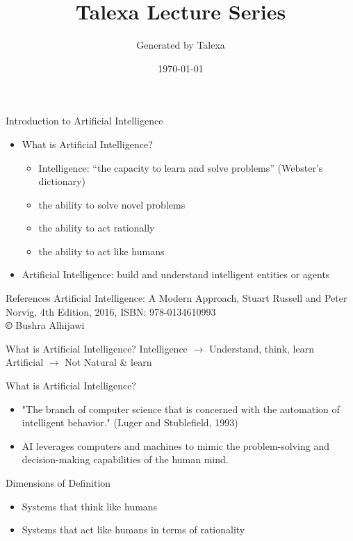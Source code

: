 \documentclass{beamer}
\title{Talexa Lecture Series}
\author{Generated by Talexa}
\date{\today}
\begin{document}
\begin{frame}
    \titlepage
\end{frame}

\begin{frame}{Introduction to Artificial Intelligence}
\begin{itemize}
\item What is Artificial Intelligence?
  \begin{itemize}
  \item Intelligence: “the capacity to learn and solve problems” (Webster's dictionary)
  \item the ability to solve novel problems
  \item the ability to act rationally
  \item the ability to act like humans
  \end{itemize}
\item Artificial Intelligence: build and understand intelligent entities or agents
\end{itemize}
\end{frame}

\begin{frame}{References}
Artificial Intelligence: A Modern Approach, Stuart Russell and Peter Norvig, 4th Edition, 2016, ISBN: 978-0134610993 \\
\textbf{\copyright} Bushra Alhijawi
\end{frame}

\begin{frame}{What is Artificial Intelligence?}
Intelligence \(\rightarrow\) Understand, think, learn\\
Artificial \(\rightarrow\) Not Natural & learn
\end{frame}

\begin{frame}{What is Artificial Intelligence?}
    \begin{itemize}
        \item "The branch of computer science that is concerned with the automation of intelligent behavior." (Luger and Stublefield, 1993)
        \item AI leverages computers and machines to mimic the problem-solving and decision-making capabilities of the human mind.
    \end{itemize}
\end{frame}

\begin{frame}{Dimensions of Definition}
    \begin{itemize}
        \item Systems that think like humans
        \item Systems that act like humans in terms of rationality
    \end{itemize}
\end{frame}
\end{document}
